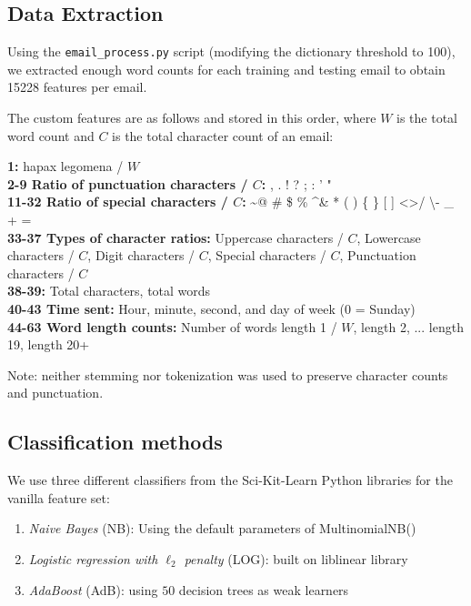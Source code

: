 \documentclass{article} %
\begin{document}
\subsection*{Data Extraction}
\par
Using the  \lstinline{email_process.py}\lstinline{} script (modifying the dictionary threshold to 100), we extracted enough word counts for each training and testing email to obtain 15228 features per email.\par 
The custom features are as follows and stored in this order, where $W$ is the total word count and $C$ is the total character count of an email:\par 
\textbf{1:} hapax legomena / $W$\\
\textbf{2-9 Ratio of punctuation characters / $C$: }  , . ! ? ; : ' "\\
\textbf{11-32 Ratio of special characters / $C$:} \textasciitilde @ \# \$ \% \textasciicircum \& * ( ) \{ \} [ ] \textless \textgreater / \textbackslash - \_ + =\\
\textbf{33-37 Types of character ratios:} Uppercase characters / $C$, Lowercase characters / $C$, Digit characters / $C$, Special characters / $C$, Punctuation characters / $C$\\
\textbf{38-39:} Total characters, total words\\
\textbf{40-43 Time sent: } Hour, minute, second, and day of week (0 = Sunday)\\
\textbf{44-63 Word length counts:} Number of words length 1 / $W$, length 2, ... length 19, length 20+

Note: neither stemming nor tokenization was used to preserve character counts and punctuation.
\subsection{Classification methods}

We use three different classifiers from the Sci-Kit-Learn Python libraries for the vanilla feature set:
\begin{enumerate}
\item \emph{Naive Bayes} (NB): Using the default parameters of MultinomialNB()
\item \emph{Logistic regression with $\ell_2$ penalty} (LOG): built on liblinear library
\item \emph{AdaBoost} (AdB): using $50$ decision trees as weak learners
\end{enumerate}
\end{document}
